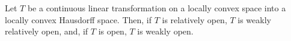 Let $T$ be a continuous linear transformation on a locally convex space into a locally convex Hausdorff space. Then, if $T$ is relatively open, $T$ is weakly relatively open, and, if $T$ is open, $T$ is weakly open.
